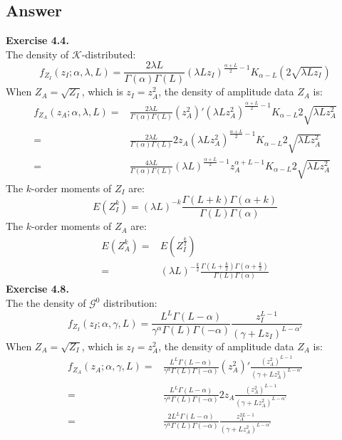 \documentclass{article}
\begin{document}
\subsection*{Answer}
\textbf{Exercise 4.4. \\}
The density of $\mathcal K$-distributed:
\begin{displaymath}
f_{Z_I}(z_I;\alpha,\lambda,L) = \frac{2\lambda L}{\Gamma(\alpha)\Gamma(L)} (\lambda L z_I)^{\frac{\alpha+L}{2}-1} K_{\alpha-L}(2\sqrt{\lambda L z_I})
\end{displaymath}
When $Z_{A} = \sqrt{Z_{I}}$, which is $z_{I} = z_{A}^2$, the density of amplitude data $Z_A$ is:
\begin{displaymath}
\begin{split}
f_{Z_A}(z_A;\alpha,\lambda,L) =& \frac{2 \lambda L}{\Gamma(\alpha) \Gamma(L)}(z_A^2)'(\lambda L z_A^2)^{\frac{\alpha+L}{2}-1} K_{\alpha-L}{2\sqrt{\lambda L z_A^2}} \\
=& \frac{2 \lambda L}{\Gamma(\alpha) \Gamma(L)}2z_A(\lambda L z_A^2)^{\frac{\alpha+L}{2}-1}K_{\alpha-L}{2\sqrt{\lambda L z_A^2}} \\
=& \frac{4 \lambda L}{\Gamma(\alpha) \Gamma(L)}(\lambda L)^{\frac{\alpha+L}{2}-1}z_A^{\alpha+L-1}K_{\alpha-L}{2\sqrt{\lambda L z_A^2}}
\end{split}
\end{displaymath}
The $k$-order moments of $Z_I$ are:
\begin{displaymath}
E(Z_I^k) = (\lambda L)^{-k}{\frac{\Gamma(L+k)\Gamma(\alpha+k)}{\Gamma(L)\Gamma(\alpha)}}
\end{displaymath}
The $k$-order moments of $Z_A$ are:
\begin{displaymath}
\begin{split}
E(Z_A^k) =& E(Z_I^{\frac{k}{2}}) \\
=& (\lambda L)^{-\frac{k}{2}}{\frac{\Gamma(L+{\frac{k}{2}})\Gamma(\alpha+\frac{k}{2})}{\Gamma(L)\Gamma(\alpha)}}
\end{split}
\end{displaymath}
\textbf{Exercise 4.8. \\}
The the density of $\mathcal G^0$ distribution:
\begin{displaymath}
f_{Z_I}(z_I; \alpha,\gamma,L) = \frac{L^L \Gamma(L-\alpha)}{\gamma^\alpha \Gamma(L)\Gamma(-\alpha)} \frac{z_I^{L-1}}{(\gamma+L z_I)^{L-\alpha'}}
\end{displaymath}
When $Z_{A} = \sqrt{Z_{I}}$, which is $z_{I} = z_{A}^2$, the density of amplitude data $Z_A$ is:
\begin{displaymath}
\begin{split}
f_{Z_A}(z_A;\alpha,\gamma,L) =& \frac{L^L \Gamma(L-\alpha)}{\gamma^\alpha \Gamma(L)\Gamma(-\alpha)}{(z_A^2)'} \frac{(z_A^2)^{L-1}}{(\gamma+{L z_A^2})^{L-\alpha'}} \\
=& \frac{L^L \Gamma(L-\alpha)}{\gamma^\alpha \Gamma(L)\Gamma(-\alpha)}{2 z_A} \frac{(z_A^2)^{L-1}}{(\gamma+{L z_A^2})^{L-\alpha'}} \\
=& \frac{2 L^L \Gamma(L-\alpha)}{\gamma^\alpha \Gamma(L)\Gamma(-\alpha)} \frac{z_A^{2L-1}}{(\gamma+{L z_A^2})^{L-\alpha'}} \\
\end{split}
\end{displaymath}
\end{document}
